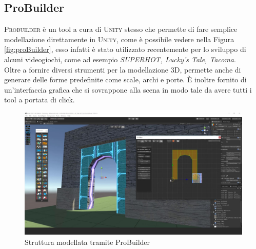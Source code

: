 \documentclass[12pt, openany]{book}
\begin{document}
	\subsection{ProBuilder}
	\textsc{Probuilder} è un tool a cura di \textsc{Unity} stesso che permette di fare semplice modellazione direttamente in \textsc{Unity}, come è possibile vedere nella Figura \ref{fig:proBuilder}, esso infatti è stato utilizzato recentemente per lo sviluppo di alcuni videogiochi, come ad esempio \emph{SUPERHOT, Lucky's Tale, Tacoma}.\\
	Oltre a fornire diversi strumenti per la modellazione 3D, permette anche di generare delle forme predefinite come scale, archi e porte. È inoltre fornito di un'interfaccia grafica che si sovrappone alla scena in modo tale da avere tutti i tool a portata di click.
		\begin{figure}[H]
		\centering
		\includegraphics[width=1\linewidth]{"Immagini/probuilder.jpg"}
		\caption{Struttura modellata tramite ProBuilder}
		\label{fig:probuilder}
	\end{figure}
\end{document}
